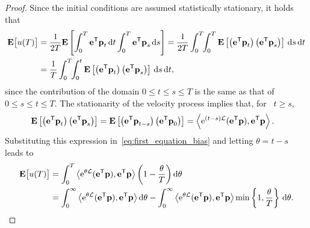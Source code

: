 \documentclass[11pt,a4paper]{article}
\begin{document}
\begin{proof}
Since the initial conditions are assumed statistically stationary,
it holds that
\begin{align}
    \notag
    \mathbf{E} \bigl[u(T)\bigr]
    &= \frac{1}{2T} \mathbf{E} \left[ \int_{0}^{T} \boldsymbol{\mathbf e}^\mathsf T \boldsymbol{\mathbf p}_{t} \, \mathrm d t \int_{0}^{T} \boldsymbol{\mathbf e}^\mathsf T \boldsymbol{\mathbf p}_s \, \mathrm d s \right]
    = \frac{1}{2T}  \int_{0}^{T} \!\! \int_{0}^{T} \mathbf{E} \left[ \left(\boldsymbol{\mathbf e}^\mathsf T \boldsymbol{\mathbf p}_t\right) \left(\boldsymbol{\mathbf e}^\mathsf T \boldsymbol{\mathbf p}_s\right) \right] \, \mathrm d s \, \mathrm d t  \\
    \label{eq:first_equation_bias}
    &= \frac{1}{T}  \int_{0}^{T} \!\! \int_{0}^{t} \mathbf{E} \left[ \left(\boldsymbol{\mathbf e}^\mathsf T \boldsymbol{\mathbf p}_t\right) \left(\boldsymbol{\mathbf e}^\mathsf T \boldsymbol{\mathbf p}_s\right) \right] \, \mathrm d s \, \mathrm d t,
\end{align}
since the contribution of the domain $0 \leq t \leq s \leq T$ is the same as that of $0 \leq s \leq t \leq T$.
The stationarity of the velocity process implies that, for ~$t \geq s$,
\begin{align*}
    \expect \left[ \left(\vect e^\t \vect p_t\right) \left(\vect e^\t \vect p_s\right) \right]
    &= \expect \left[ \left(\vect e^\t \vect p_{t-s}\right) \left(\vect e^\t \vect p_0\right) \right]
    = \ip{\e^{(t-s) \mathcal L} (\vect e^\t \vect p)}{\vect e^\t \vect p}.
\end{align*}
Substituting this expression in~\eqref{eq:first_equation_bias} and letting $\theta = t-s$ leads to
\begin{equation}
\label{eq:bias_without_control}
\begin{aligned}[b]
    \expect \bigl[u(T)\bigr]
    &= \int_{0}^{T} \ip{\e^{\theta \mathcal L} (\vect e^\t \vect p)}{\vect e^\t \vect p} \left(1 - \frac{\theta}{T}\right) \d \theta  \\
    &= \int_{0}^{\infty} \ip{\e^{\theta \mathcal L}(\vect e^\t \vect p)}{\vect e^\t \vect p}  \d \theta
    - \int_{0}^{\infty} \ip{\e^{\theta \mathcal L} (\vect e^\t \vect p)}{\vect e^\t \vect p} \min\left\{1, \frac{\theta}{T}\right\} \, \d \theta.

\end{aligned}
\end{equation}
\end{proof}
\end{document}
